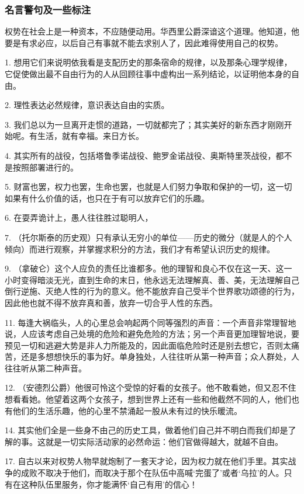 \subsubsection{名言警句及一些标注}

权势在社会上是一种资本，不应随便动用。华西里公爵深谙这个道理。他知道，他要是有求必应，以后自己有事就不能去求别人了，因此难得使用自己的权势。

1. 想用它们来说明依我看是支配历史的那条宿命的规律，以及那条心理学规律，它促使做出最不自由行为的人从回顾往事中虚构出一系列结论，以证明他本身的自由。

2. 理性表达必然规律，意识表达自由的实质。

3. 我们总以为一旦离开走惯的道路，一切就都完了；其实美好的新东西才刚刚开始呢。有生活，就有幸福。来日方长。

4. 其实所有的战役，包括塔鲁季诺战役、鲍罗金诺战役、奥斯特里茨战役，都不是按照部署进行的。

5. 财富也罢，权力也罢，生命也罢，也就是人们努力争取和保护的一切，这一切如果有什么价值的话，也只在于有可以放弃它们的乐趣。

6. 在耍弄诡计上，愚人往往胜过聪明人，

7. （托尔斯泰的历史观）只有承认无穷小的单位——历史的微分（就是人的个人倾向）而进行观察，并掌握求积分的方法，我们才有希望认识历史的规律。

9. （拿破仑）这个人应负的责任比谁都多。他的理智和良心不仅在这一天、这一小时变得暗淡无光，直到生命的末日，他永远无法理解真、善、美，无法理解自己倒行逆施、灭绝人性的行为的意义。他不能放弃自己受半个世界歌功颂德的行为，因此他也就不得不放弃真和善，放弃一切合乎人性的东西。

11. 每逢大祸临头，人的心里总会响起两个同等强烈的声音：一个声音非常理智地说，人应该考虑自己处境的危险和避免危险的方法；另一个声音更加理智地说，要预见一切和逃避大势是非人力所能及的，因此面临危险时还是别去想它，否则太痛苦，还是多想想快乐的事为好。单身独处，人往往听从第一种声音；众人群处，人往往听从第二种声音。

12. （安德烈公爵）他很可怜这个受惊的好看的女孩子。他不敢看她，但又忍不住想看看她。他望着这两个女孩子，想到世界上还有一些和他截然不同的人，他们也有他们的生活乐趣，他的心里不禁涌起一股从未有过的快乐暖流。

14. 其实他们全是一些身不由己的历史工具，做着他们自己并不明白而我们却是了解的事。这就是一切实际活动家的必然命运：他们官做得越大，就越不自由。

17. 自古以来对权势人物早就炮制了一套天才论，因为权力就在他们手里。其实战争的成败不取决于他们，而取决于那个在队伍中高喊‘完蛋了’或者‘乌拉’的人。只有在这种队伍里服务，你才能满怀‘自己有用’的信心！

